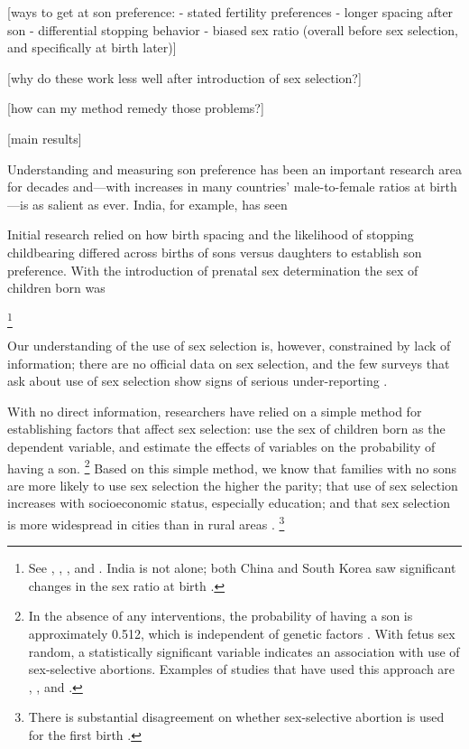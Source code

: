 \documentclass[12pt,letterpaper]{article}
\begin{document}
[ways to get at son preference:
- stated fertility preferences
- longer spacing after son
- differential stopping behavior
- biased sex ratio (overall before sex selection, and specifically at birth later)]

[why do these work less well after introduction of sex selection?]

[how can my method remedy those problems?]

[main results]

Understanding and measuring son preference has been an important research 
area for decades and---with increases in many countries' male-to-female ratios 
at birth---is as salient as ever.
India, for example, has seen 


Initial research relied on how birth spacing and the likelihood of stopping 
childbearing differed across births of sons versus daughters to establish 
son preference.
With the introduction of prenatal sex determination the sex of children
born was 




%
\footnote{
See \citet{das_gupta97}, \citet{Sudha1999},
\citet{Arnold2002}, \cite{retherford03b} and \citet{jha06}.
India is not alone; both China and South Korea saw
significant changes in the sex ratio at birth \citep{Yi1993,park95}.
}



Our understanding of the use of sex selection is, however, constrained by 
lack of information;
there are no official data on sex selection, and the few surveys that ask about use of 
sex selection show signs of serious under-reporting \citep{goodkind96}.


With no direct information, researchers have relied on a simple method for establishing 
factors that affect sex selection: use the sex of children born as the 
dependent variable, and estimate the effects of variables on the probability of having a son.%
\footnote{
In the absence of any interventions, the probability of having a son
is approximately 0.512, which is independent of genetic factors \citep{ben-porath76b,jacobsen99}.
With fetus sex random, a statistically significant variable indicates an association with 
use of sex-selective abortions.
Examples of studies that have used this approach are \cite{retherford03b},
\cite{jha06}, and \cite{abrevaya09}. 
}
Based on this simple method, we know that families with no sons are more likely to
use sex selection the higher the parity;
that use of sex selection increases with socioeconomic status, especially education;
and that sex selection is more widespread in cities than in rural areas 
\citep{retherford03b,jha06,abrevaya09}.%
\footnote{
There is substantial disagreement on whether sex-selective abortion is used for the 
first birth \citep{retherford03b,jha06}.
}
\end{document}
